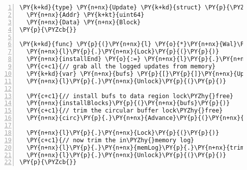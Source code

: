 \begin{Verbatim}[commandchars=\\\{\},numbers=left,firstnumber=1,stepnumber=1,codes={\catcode`\$=3\catcode`\^=7\catcode`\_=8},fontsize=\small,numbersep=6pt,xleftmargin=0.2in]
\PY{k+kd}{type} \PY{n+nx}{Update} \PY{k+kd}{struct} \PY{p}{\PYZob{}}
  \PY{n+nx}{Addr} \PY{k+kt}{uint64}
  \PY{n+nx}{Data} \PY{n+nx}{Block}
\PY{p}{\PYZcb{}}

\PY{k+kd}{func} \PY{p}{(}\PY{n+nx}{l} \PY{o}{*}\PY{n+nx}{Wal}\PY{p}{)} \PY{n+nx}{install}\PY{p}{(}\PY{p}{)} \PY{p}{\PYZob{}}
  \PY{n+nx}{l}\PY{p}{.}\PY{n+nx}{Lock}\PY{p}{(}\PY{p}{)}
  \PY{n+nx}{installEnd} \PY{o}{:=} \PY{n+nx}{l}\PY{p}{.}\PY{n+nx}{diskEnd}
  \PY{c+c1}{// grab all the logged updates from memory}
  \PY{k+kd}{var} \PY{n+nx}{bufs} \PY{p}{[}\PY{p}{]}\PY{n+nx}{Update} \PY{p}{=} \PY{n+nx}{l}\PY{p}{.}\PY{n+nx}{memLog}\PY{p}{.}\PY{n+nx}{takeTill}\PY{p}{(}\PY{n+nx}{installEnd}\PY{p}{)}
  \PY{n+nx}{l}\PY{p}{.}\PY{n+nx}{Unlock}\PY{p}{(}\PY{p}{)}

  \PY{c+c1}{// install bufs to data region lock\PYZhy{}free}
  \PY{n+nx}{installBlocks}\PY{p}{(}\PY{n+nx}{bufs}\PY{p}{)}
  \PY{c+c1}{// trim the circular buffer lock\PYZhy{}free}
  \PY{n+nx}{circ}\PY{p}{.}\PY{n+nx}{Advance}\PY{p}{(}\PY{n+nx}{installEnd}\PY{p}{)}

  \PY{n+nx}{l}\PY{p}{.}\PY{n+nx}{Lock}\PY{p}{(}\PY{p}{)}
  \PY{c+c1}{// now trim the in\PYZhy{}memory log}
  \PY{n+nx}{l}\PY{p}{.}\PY{n+nx}{memLog}\PY{p}{.}\PY{n+nx}{trimTill}\PY{p}{(}\PY{n+nx}{installEnd}\PY{p}{)}
  \PY{n+nx}{l}\PY{p}{.}\PY{n+nx}{Unlock}\PY{p}{(}\PY{p}{)}
\PY{p}{\PYZcb{}}
\end{Verbatim}
